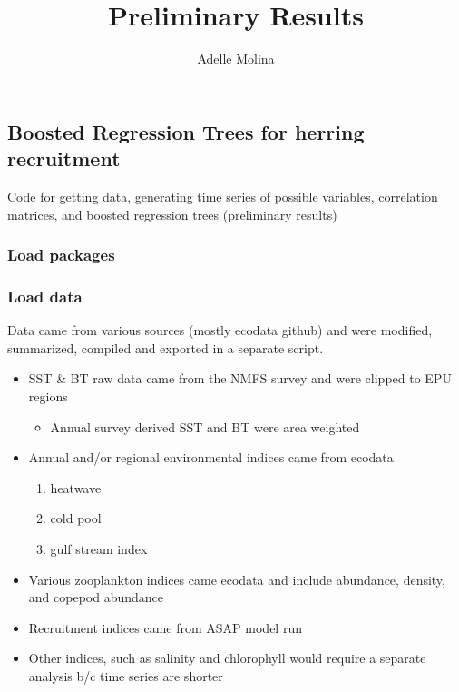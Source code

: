\documentclass[
  letterpaper,
  DIV=11,
  numbers=noendperiod]{scrartcl}
\title{Preliminary Results}
\author{Adelle Molina}
\date{}
\providecommand{\tightlist}{%
  \setlength{\itemsep}{0pt}\setlength{\parskip}{0pt}}\usepackage{longtable,booktabs,array}
\begin{document}
\maketitle
\ifdefined\Shaded\renewenvironment{Shaded}{\begin{tcolorbox}[borderline west={3pt}{0pt}{shadecolor}, breakable, boxrule=0pt, enhanced, interior hidden, frame hidden, sharp corners]}{\end{tcolorbox}}\fi

\hypertarget{boosted-regression-trees-for-herring-recruitment}{%
\subsection{Boosted Regression Trees for herring
recruitment}\label{boosted-regression-trees-for-herring-recruitment}}

Code for getting data, generating time series of possible variables,
correlation matrices, and boosted regression trees (preliminary results)

\hypertarget{load-packages}{%
\subsubsection{Load packages}\label{load-packages}}

\hypertarget{load-data}{%
\subsubsection{Load data}\label{load-data}}

Data came from various sources (mostly ecodata github) and were
modified, summarized, compiled and exported in a separate script.

\begin{itemize}
\tightlist
\item
  SST \& BT raw data came from the NMFS survey and were clipped to EPU
  regions

  \begin{itemize}
  \tightlist
  \item
    Annual survey derived SST and BT were area weighted
  \end{itemize}
\item
  Annual and/or regional environmental indices came from ecodata

  \begin{enumerate}
  \def\labelenumi{\arabic{enumi}.}
  \item
    heatwave
  \item
    cold pool
  \item
    gulf stream index
  \end{enumerate}
\item
  Various zooplankton indices came ecodata and include abundance,
  density, and copepod abundance
\item
  Recruitment indices came from ASAP model run
\item
  Other indices, such as salinity and chlorophyll would require a
  separate analysis b/c time series are shorter
\end{itemize}
\end{document}
